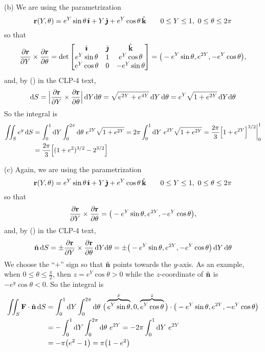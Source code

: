 \begin{solution}
(b) We are using the parametrization
\begin{equation*}
\mathbf{r}(Y,\theta) = e^Y\sin\theta\,\hat{\pmb{\imath}} + Y\,\hat{\pmb{\jmath}} +e^Y\cos\theta\,\hat{\mathbf{k}}\qquad
0\le Y\le 1,\ 0\le\theta\le 2\pi
\end{equation*}
so that
\begin{equation*}
\frac{\partial\mathbf{r}}{\partial Y}\times\frac{\partial\mathbf{r}}{\partial\theta}
= \det\left[\begin{matrix} \hat{\pmb{\imath}} & \hat{\pmb{\jmath}} & \hat{\mathbf{k}} \\
e^Y\sin\theta & 1 & e^Y\cos\theta \\
e^Y\cos\theta & 0 & -e^Y\sin\theta \end{matrix}\right]
= \big(-e^Y\sin\theta, e^{2Y}, -e^Y\cos\theta\big),
\end{equation*}
and, by () in the CLP-4 text,
\begin{align*}
\mathrm{d}S = \Big|\frac{\partial\mathbf{r}}{\partial Y}\times
            \frac{\partial\mathbf{r}}{\partial\theta}\Big|\,\mathrm{d}Y\mathrm{d}\theta
= \sqrt{e^{2Y}+e^{4Y}}\,\mathrm{d}Y\,\mathrm{d}\theta
= e^Y\sqrt{1+e^{2Y}}\,\mathrm{d}Y\mathrm{d}\theta
\end{align*}
So the integral is
\begin{align*}
\iint_S e^y\, \mathrm{d}S
&=\int_0^1\mathrm{d}Y\int_0^{2\pi}\mathrm{d}\theta\ e^{2Y}\sqrt{1+e^{2Y}}
=2\pi \int_0^1\mathrm{d}Y\ e^{2Y}\sqrt{1+e^{2Y}}
=\frac{2\pi}{3}\Big[1+e^{2Y}\Big]^{3/2}\bigg|_0^1 \\
&=\frac{2\pi}{3}\Big[(1+e^2)^{3/2}-2^{3/2}\Big]
\end{align*}

(c) Again, we are using the parametrization
\begin{equation*}
\mathbf{r}(Y,\theta) = e^Y\sin\theta\,\hat{\pmb{\imath}} + Y\,\hat{\pmb{\jmath}} +e^Y\cos\theta\,\hat{\mathbf{k}}\qquad
0\le Y\le 1,\ 0\le\theta\le 2\pi
\end{equation*}
so that
\begin{equation*}
\frac{\partial\mathbf{r}}{\partial Y}\times\frac{\partial\mathbf{r}}{\partial\theta}
= \big(-e^Y\sin\theta, e^{2Y}, -e^Y\cos\theta\big),
\end{equation*}
and, by () in the CLP-4 text,
\begin{align*}
\hat{\mathbf{n}}\,\mathrm{d}S = \pm\frac{\partial\mathbf{r}}{\partial Y}\times
            \frac{\partial\mathbf{r}}{\partial\theta}\,\mathrm{d}Y\mathrm{d}\theta
= \pm\big(-e^Y\sin\theta, e^{2Y}, -e^Y\cos\theta\big)\,\mathrm{d}Y\,\mathrm{d}\theta
\end{align*}
We choose the ``$+$'' sign so that $\hat{\mathbf{n}}$ points towards the $y$-axis.
As an example, when $0\le\theta\le\frac{\pi}{2}$, then $z=e^Y\cos\theta>0$
while the $z$-coordinate of $\hat{\mathbf{n}}$ is $-e^y\cos\theta<0$. So the integral is
\begin{align*}
\dblInt_S\vF\cdot\hn\,\dee{S}
&=\int_0^1\dee{Y}\int_0^{2\pi}\dee{\theta}\ 
\big(\overbrace{e^Y\sin\theta}^{x},0,\overbrace{e^Y\cos\theta}^{z}\big)
           \cdot\big(-e^Y\sin\theta, e^{2Y}, -e^Y\cos\theta\big) \\
&=-\int_0^1\dee{Y}\int_0^{2\pi}\dee{\theta}\ e^{2Y}
=-2\pi\int_0^1\dee{Y}\ e^{2Y} \\
&=-\pi\big(e^2-1\big)
=\pi\big(1-e^2\big)
\end{align*}
\end{solution}

